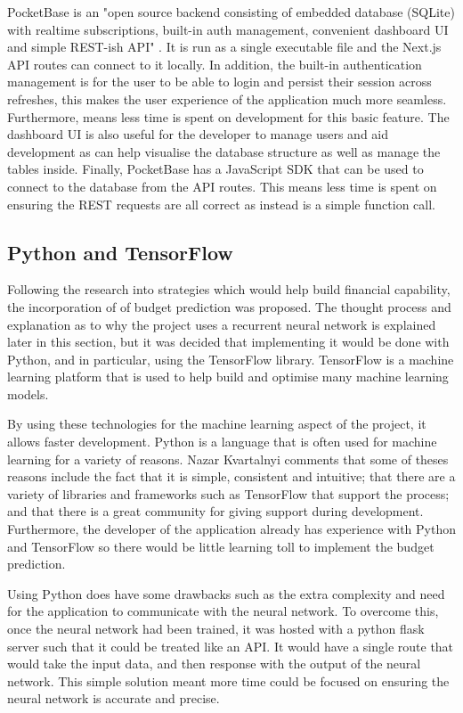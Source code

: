 PocketBase is an "open source backend consisting of embedded database (SQLite) with realtime subscriptions, built-in auth management, convenient dashboard UI and simple REST-ish API" \cite{PocketBaseDocs}. It is run as a single executable file and the Next.js API routes can connect to it locally. In addition, the built-in authentication management is for the user to be able to login and persist their session across refreshes, this makes the user experience of the application much more seamless. Furthermore, means less time is spent on development for this basic feature. The dashboard UI is also useful for the developer to manage users and aid development as can help visualise the database structure as well as manage the tables inside. Finally, PocketBase has a JavaScript SDK that can be used to connect to the database from the API routes. This means less time is spent on ensuring the REST requests are all correct as instead is a simple function call.

\subsection{Python and TensorFlow}
Following the research into strategies which would help build financial capability, the incorporation of of budget prediction was proposed. The thought process and explanation as to why the project uses a recurrent neural network is explained later in this section, but it was decided that implementing it would be done with Python, and in particular, using the TensorFlow library. TensorFlow is a machine learning platform that is used to help build and optimise many machine learning models. 

By using these technologies for the machine learning aspect of the project, it allows faster development. Python is a language that is often used for machine learning for a variety of reasons. Nazar Kvartalnyi \cite{PythonML} comments that some of theses reasons include the fact that it is simple, consistent and intuitive; that there are a variety of libraries and frameworks such as TensorFlow that support the process; and that there is a great community for giving support during development. Furthermore, the developer of the application already has experience with Python and TensorFlow so there would be little learning toll to implement the budget prediction.

Using Python does have some drawbacks such as the extra complexity and need for the application to communicate with the neural network. To overcome this, once the neural network had been trained, it was hosted with a python flask server such that it could be treated like an API. It would have a single route that would take the input data, and then response with the output of the neural network. This simple solution meant more time could be focused on ensuring the neural network is accurate and precise.

